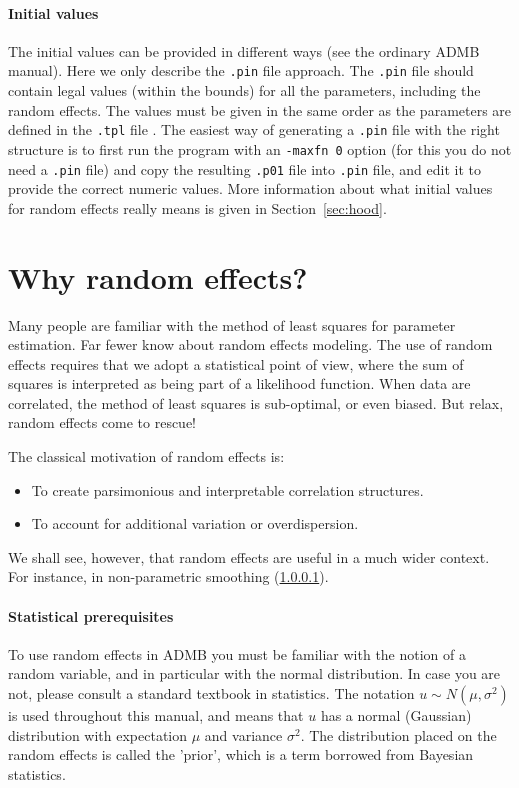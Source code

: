 \documentclass[12pt,letter,reqno]{book}
\begin{document}
\paragraph{Initial values}
The initial values can be provided in different ways (see the ordinary ADMB manual). Here
we only describe the \texttt{.pin} file approach. The \texttt{.pin} file should contain
legal values (within the bounds) for all the parameters, including the random effects.
The values must be given in the same order as the parameters are defined in the \texttt{.tpl} file .
The easiest way of generating a \texttt{.pin} file with the right structure is to 
first run the program with an \texttt{-maxfn 0} option (for this you do not need a \texttt{.pin} file)
and copy the resulting \texttt{.p01} file into \texttt{.pin} file, and edit it to provide the correct numeric values.
More information about what initial values for random effects really means is given in Section~\ref{sec:hood}.

\section{Why random effects?}

Many people are familiar with the method of least squares for parameter estimation. Far fewer know about random
effects modeling. The use of random effects requires that we adopt a statistical point of view, where the sum of
squares is interpreted as being part of a likelihood function. When data are correlated, the method of least
squares is sub-optimal, or even biased. But relax, random effects come to rescue! 

The classical motivation of random effects is:

\begin{itemize}
\item To create parsimonious and interpretable correlation structures.

\item To account for additional variation or overdispersion.
\end{itemize}
We shall see, however, that random effects are useful in a much wider context. 
For instance, in non-parametric smoothing (\ref{}).

\paragraph{Statistical prerequisites}
To use random effects in ADMB you must be familiar with the notion of a random variable, and in particular with
the normal distribution. In case you are not, please consult a standard textbook in statistics. The notation
$u\sim N(\mu ,\sigma ^{2})$ is used throughout this manual, and means that $u$ has a normal (Gaussian)
distribution with expectation $\mu $ and variance $\sigma ^{2}$. The distribution placed on the random effects
is called the 'prior', which is a term borrowed from Bayesian statistics.
\end{document}
